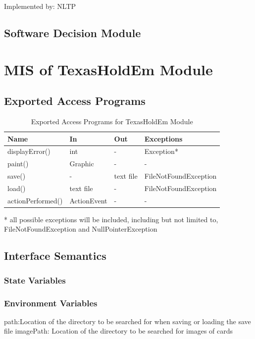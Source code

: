\documentclass[11pt]{article}
\begin{document}
    Implemented by: NLTP\\

    \subsection{Software Decision Module}
    
    \section{MIS of TexasHoldEm Module}
    
    \subsection{Exported Access Programs}
    \begin{table}[h]
    \caption{Exported Access Programs for TexasHoldEm Module}
    \begin{tabular}{p{4cm}p{2cm}p{2cm}p{4cm}}
    Name & In & Out & Exceptions\\
    \hline
	displayError() & int & - & Exception*\\
	\hline
    paint() & Graphic & - & -\\
    \hline
    save() & - & text file & FileNotFoundException\\
    \hline
    load() & text file & - & FileNotFoundException\\
    \hline
    actionPerformed() & ActionEvent &  - & - \\
    \hline
    \end{tabular}
    * all possible exceptions will be included, including but not limited to, FileNotFoundException and NullPointerException
    \end{table}
    
    \subsection{Interface Semantics}
    \subsubsection{State Variables}
    
    \subsubsection{Environment Variables}
	path:Location of the directory to be searched for when saving or loading the save file
	imagePath: Location of the directory to be searched for images of cards
\end{document}
